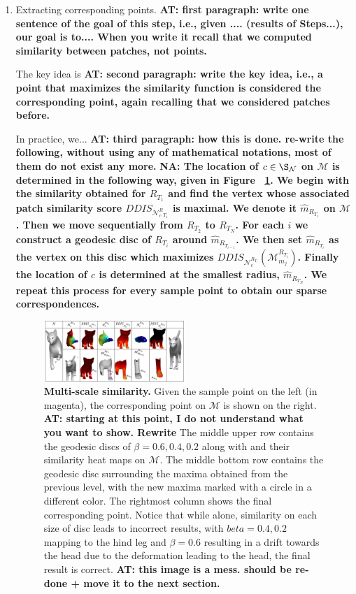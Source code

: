 \documentclass[10pt,twocolumn,letterpaper]{article}
\newcommand{\colornote}[3]{{\color{#1}\bf{#2: #3}\normalfont}}
\newcommand{\colornote}[3]{}
\newcommand {\ayellet}[1]{\colornote{blue}{AT}{#1}}
\newcommand {\nadav}[1]{\colornote{red}{NA}{#1}}
\begin{document}
\begin{enumerate}
    \item{Extracting corresponding points.}
    \ayellet{first paragraph: write one sentence of the goal of this step, i.e., given .... (results of Steps...), our goal is to.... When you write it recall that we computed similarity between patches, not points.}
    
    The key idea is
    \ayellet{second paragraph: write the key idea, i.e., a point that maximizes the similarity function is considered the corresponding point, again recalling that we considered patches before.}

    In practice, we...
    \ayellet{third paragraph: how this is done. re-write the following, without using any of  mathematical notations, most of them do not exist any more.}
    \nadav{The location of $c\in\S_\mathcal{N}$ on $\mathcal{M}$ is determined in the following way, given in Figure ~\ref{fig:multiscale}. We begin with the similarity obtained for $R_{T_1}$ and find the vertex whose associated patch similarity score $DDIS_{\mathcal{N}_c^R_{T_1}}$ is maximal. We denote it $\hat{m}_{R_{T_1}}$ on $\mathcal{M}$. Then we move sequentially from $R_{T_2}$ to $R_{T_N}$. For each $i$ we construct a geodesic disc of $R_{T_i}$ around $\hat{m}_{R_{T_{i-1}}}$. We then set $\hat{m}_{R_{T_i}}$ as the vertex on this disc which maximizes $DDIS_{\mathcal{N}^{R_{T_i}}_{c}}(\mathcal{M}_{m_j}^{R_{T_i}})$. Finally the location of $c$ is determined at the smallest radius,  $\hat{m}_{R_{T_N}}$. We repeat this process for every sample point to obtain our sparse correspondences.}
    
    \begin{figure}[htb]
	\includegraphics[width=0.5\textwidth]{figures/MultiScaleDis.png}
	\caption{{\bf Multi-scale similarity.} 
	Given the sample point on the left (in magenta), the corresponding point on  $\mathcal{M}$ is shown on the right. 
	\ayellet{starting at this point, I do not understand what you want to show. Rewrite}
	The middle upper row contains the geodesic discs of $\beta = 0.6,0.4,0.2$ along with and their similarity heat maps on $\mathcal{M}$. 
	The middle bottom row contains the geodesic disc surrounding the maxima obtained from the previous level, with the new maxima marked with a circle in a different color. The rightmost column shows the final corresponding point. Notice that while alone, similarity on each size of disc leads to incorrect results, with $beta=0.4,0.2$ mapping to the hind leg and $\beta=0.6$ resulting in a drift towards the head due to the deformation leading to the head, the final result is correct.
	\ayellet{this image is a mess. should be re-done + move it to the next section.}
	}
	\label{fig:multiscale}


\end{figure}
\end{enumerate}
\end{document}
